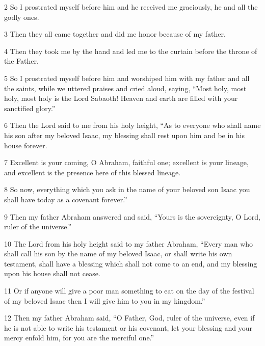 \par 2 So I prostrated myself before him and he received me graciously, he and all the godly ones. 

\par 3 Then they all came together and did me honor because of my father. 

\par 4 Then they took me by the hand and led me to the curtain before the throne of the Father. 

\par 5 So I prostrated myself before him and worshiped him with my father and all the saints, while we uttered praises and cried aloud, saying, “Most holy, most holy, most holy is the Lord Sabaoth! Heaven and earth are filled with your sanctified glory.” 

\par 6 Then the Lord said to me from his holy height, “As to everyone who shall name his son after my beloved Isaac, my blessing shall rest upon him and be in his house forever. 

\par 7 Excellent is your coming, O Abraham, faithful one; excellent is your lineage, and excellent is the presence here of this blessed lineage. 

\par 8 So now, everything which you ask in the name of your beloved son Isaac you shall have today as a covenant forever.” 

\par 9 Then my father Abraham answered and said, “Yours is the sovereignty, O Lord, ruler of the universe.” 

\par 10 The Lord from his holy height said to my father Abraham, “Every man who shall call his son by the name of my beloved Isaac, or shall write his own testament, shall have a blessing which shall not come to an end, and my blessing upon his house shall not cease. 

\par 11 Or if anyone will give a poor man something to eat on the day of the festival of my beloved Isaac then I will give him to you in my kingdom.” 

\par 12 Then my father Abraham said, “O Father, God, ruler of the universe, even if he is not able to write his testament or his covenant, let your blessing and your mercy enfold him, for you are the merciful one.” 

